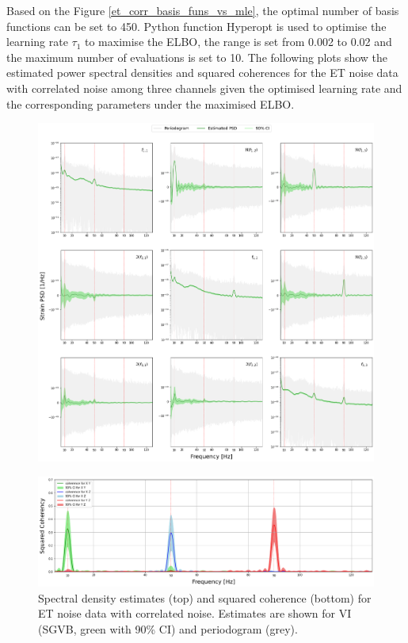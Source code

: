 \documentclass[%
 reprint,
 amsmath,amssymb,
 aps,
]{revtex4-2}
\begin{document}
Based on the Figure \ref {et_corr_basis_funs_vs_mle}, the optimal number of basis functions can be set to 450. Python function Hyperopt is used to optimise the learning rate $\tau_1$ to maximise the ELBO, the range is set from 0.002 to 0.02 and the maximum number of evaluations is set to 10. The following plots show the estimated power spectral densities and squared coherences for the ET noise data with correlated noise among three channels given the optimised learning rate and the corresponding parameters under the maximised ELBO.
\begin{figure}
\centering
  \includegraphics[width=15cm]{ET corr noise psd.png}
\end{figure}

\begin{figure}
\centering
  \includegraphics[width=15cm]{ET corr noise coh.png}
  \caption{Spectral density estimates (top) and squared coherence (bottom) for ET noise data with correlated noise. Estimates are shown for VI (SGVB, green with 90\% CI) and periodogram (grey).}
\end{figure}
\end{document}
